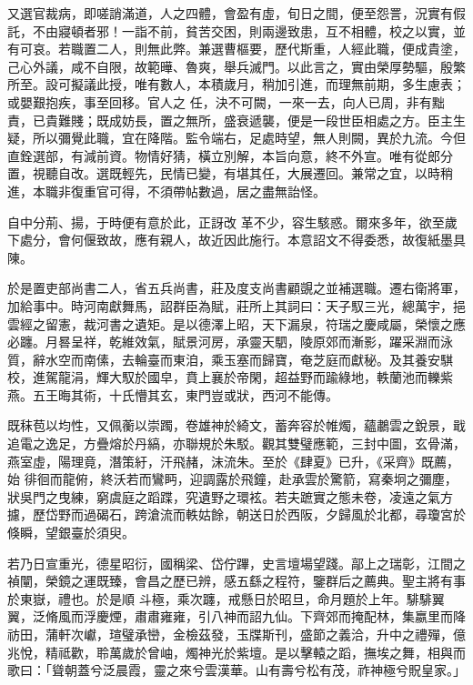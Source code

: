 \begin{pinyinscope}
 又選官裁病，即嗟誚滿道，人之四體，會盈有虛，旬日之間，便至怨詈，況實有假託，不由寢頓者邪！一詣不前，貧苦交困，則兩邊致患，互不相體，校之以實，並有可哀。若職置二人，則無此弊。兼選曹樞要，歷代斯重，人經此職，便成貴塗，己心外議，咸不自限，故範曄、魯爽，舉兵滅門。以此言之，實由榮厚勢驅，殷繁所至。設可擬議此授，唯有數人，本積歲月，稍加引進，而理無前期，多生慮表；或嬰艱抱疾，事至回移。官人之
 任，決不可闕，一來一去，向人已周，非有黜責，已貴難賤；既成妨長，置之無所，盛衰遞襲，便是一段世臣相處之方。臣主生疑，所以彌覺此職，宜在降階。監令端右，足處時望，無人則闕，異於九流。今但直銓選部，有減前資。物情好猜，橫立別解，本旨向意，終不外宣。唯有從郎分置，視聽自改。選既輕先，民情已變，有堪其任，大展遷回。兼常之宜，以時稍進，本職非復重官可得，不須帶帖數過，居之盡無詒怪。



 自中分荊、揚，于時便有意於此，正訝改
 革不少，容生駭惑。爾來多年，欲至歲下處分，會何偃致故，應有親人，故近因此施行。本意詔文不得委悉，故復紙墨具陳。



 於是置吏部尚書二人，省五兵尚書，莊及度支尚書顧覬之並補選職。遷右衛將軍，加給事中。時河南獻舞馬，詔群臣為賦，莊所上其詞曰：天子馭三光，總萬宇，挹雲經之留憲，裁河書之遺矩。是以德澤上昭，天下漏泉，符瑞之慶咸屬，榮懷之應必躔。月晷呈祥，乾維效氣，賦景河房，承靈天駟，陵原郊而漸影，躍采淵而泳
 質，辭水空而南傃，去輪臺而東洎，乘玉塞而歸寶，奄芝庭而獻秘。及其養安騏校，進駕龍涓，輝大馭於國皁，賁上襄於帝閑，超益野而踰綠地，軼蘭池而轢紫燕。五王晦其術，十氏懵其玄，東門豈或狀，西河不能傳。



 既秣苞以均性，又佩蘅以崇躅，卷雄神於綺文，蓄奔容於帷燭，蘊鷫雲之銳景，戢追電之逸足，方疊熔於丹縞，亦聯規於朱駁。觀其雙璧應範，三封中圖，玄骨滿，燕室虛，陽理竟，潛策紆，汗飛赭，沫流朱。至於《肆夏》已升，《采齊》既薦，始
 徘徊而龍俯，終沃若而鸞眄，迎調露於飛鐘，赴承雲於驚箭，寫秦坰之彌塵，狀吳門之曳練，窮虞庭之蹈蹀，究遺野之環袨。若夫蹠實之態未卷，凌遠之氣方攄，歷岱野而過碣石，跨滄流而軼姑餘，朝送日於西阪，夕歸風於北都，尋瓊宮於倏瞬，望銀臺於須臾。



 若乃日宣重光，德星昭衍，國稱梁、岱佇蹕，史言壇場望踐。鄗上之瑞彰，江間之禎闡，榮鏡之運既臻，會昌之歷已辨，感五繇之程符，鑒群后之薦典。聖主將有事於東嶽，禮也。於是順
 斗極，乘次躔，戒懸日於昭旦，命月題於上年。騑騑翼翼，泛脩風而浮慶煙，肅肅雍雍，引八神而詔九仙。下齊郊而掩配林，集嬴里而降祊田，蒲軒次巘，瑄璧承巒，金檢茲發，玉牒斯刊，盛節之義洽，升中之禮殫，億兆悅，精祗歡，聆萬歲於曾岫，燭神光於紫壇。是以擊轅之蹈，撫埃之舞，相與而歌曰：「聳朝蓋兮泛晨霞，靈之來兮雲漢華。山有壽兮松有茂，祚神極兮貺皇家。」




\end{pinyinscope}
